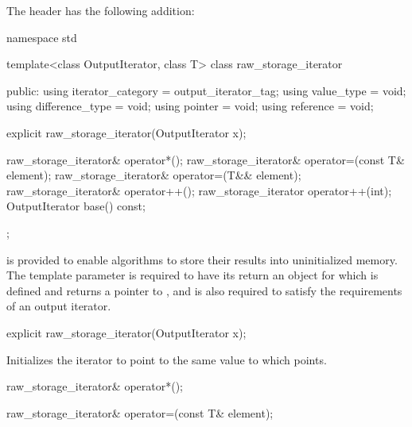 \pnum
The header
%
 has the following addition:

%
\begin{codeblock}
namespace std {
  template<class OutputIterator, class T>
  class raw_storage_iterator {
  public:
    using iterator_category = output_iterator_tag;
    using value_type        = void;
    using difference_type   = void;
    using pointer           = void;
    using reference         = void;

    explicit raw_storage_iterator(OutputIterator x);

    raw_storage_iterator& operator*();
    raw_storage_iterator& operator=(const T& element);
    raw_storage_iterator& operator=(T&& element);
    raw_storage_iterator& operator++();
    raw_storage_iterator  operator++(int);
    OutputIterator base() const;
  };
}
\end{codeblock}

\pnum
{} is provided to enable algorithms to store their
results into uninitialized memory. The template parameter
 is required to have its  return an
object for which  is defined and returns a pointer to
, and is also required to satisfy the requirements of an output
iterator.

%
\begin{itemdecl}
explicit raw_storage_iterator(OutputIterator x);
\end{itemdecl}

\begin{itemdescr}
\pnum
\effects
Initializes the iterator to point to the same value to which  points.
\end{itemdescr}

%
\begin{itemdecl}
raw_storage_iterator& operator*();
\end{itemdecl}

\begin{itemdescr}
\pnum
\returns
{}
\end{itemdescr}

%
\begin{itemdecl}
raw_storage_iterator& operator=(const T& element);
\end{itemdecl}

